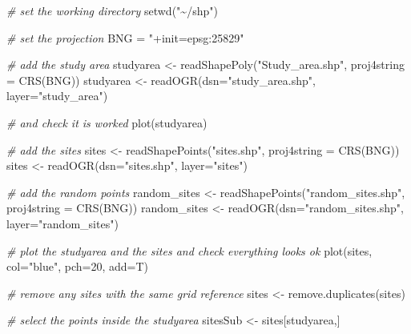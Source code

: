 \documentclass[
]{article}
\newenvironment{Shaded}{\begin{snugshade}}{\end{snugshade}}
\newcommand{\AttributeTok}[1]{\textcolor[rgb]{0.77,0.63,0.00}{#1}}
\newcommand{\CommentTok}[1]{\textcolor[rgb]{0.56,0.35,0.01}{\textit{#1}}}
\newcommand{\DecValTok}[1]{\textcolor[rgb]{0.00,0.00,0.81}{#1}}
\newcommand{\FunctionTok}[1]{\textcolor[rgb]{0.00,0.00,0.00}{#1}}
\newcommand{\NormalTok}[1]{#1}
\newcommand{\OtherTok}[1]{\textcolor[rgb]{0.56,0.35,0.01}{#1}}
\newcommand{\StringTok}[1]{\textcolor[rgb]{0.31,0.60,0.02}{#1}}
\begin{document}
\begin{Shaded}
\begin{Highlighting}[]
\CommentTok{\# set the working directory             }
\FunctionTok{setwd}\NormalTok{(}\StringTok{"\textasciitilde{}/shp"}\NormalTok{)}

\CommentTok{\# set the projection }
\NormalTok{BNG }\OtherTok{=} \StringTok{"+init=epsg:25829"}

\CommentTok{\# add the study area }
\NormalTok{studyarea }\OtherTok{\textless{}{-}} \FunctionTok{readShapePoly}\NormalTok{(}\StringTok{"Study\_area.shp"}\NormalTok{, }\AttributeTok{proj4string =} \FunctionTok{CRS}\NormalTok{(BNG))}
\NormalTok{studyarea }\OtherTok{\textless{}{-}} \FunctionTok{readOGR}\NormalTok{(}\AttributeTok{dsn=}\StringTok{"study\_area.shp"}\NormalTok{, }\AttributeTok{layer=}\StringTok{"study\_area"}\NormalTok{)}

\CommentTok{\# and check it is worked}
\FunctionTok{plot}\NormalTok{(studyarea)}

\CommentTok{\# add the sites}
\NormalTok{sites }\OtherTok{\textless{}{-}} \FunctionTok{readShapePoints}\NormalTok{(}\StringTok{"sites.shp"}\NormalTok{, }\AttributeTok{proj4string =} \FunctionTok{CRS}\NormalTok{(BNG))}
\NormalTok{sites }\OtherTok{\textless{}{-}} \FunctionTok{readOGR}\NormalTok{(}\AttributeTok{dsn=}\StringTok{"sites.shp"}\NormalTok{, }\AttributeTok{layer=}\StringTok{"sites"}\NormalTok{)}

\CommentTok{\# add the random points}
\NormalTok{random\_sites }\OtherTok{\textless{}{-}} \FunctionTok{readShapePoints}\NormalTok{(}\StringTok{"random\_sites.shp"}\NormalTok{, }\AttributeTok{proj4string =} \FunctionTok{CRS}\NormalTok{(BNG))}
\NormalTok{random\_sites }\OtherTok{\textless{}{-}} \FunctionTok{readOGR}\NormalTok{(}\AttributeTok{dsn=}\StringTok{"random\_sites.shp"}\NormalTok{, }\AttributeTok{layer=}\StringTok{"random\_sites"}\NormalTok{)}

\CommentTok{\# plot the studyarea and the sites and check everything looks ok}
\FunctionTok{plot}\NormalTok{(sites, }\AttributeTok{col=}\StringTok{"blue"}\NormalTok{, }\AttributeTok{pch=}\DecValTok{20}\NormalTok{, }\AttributeTok{add=}\NormalTok{T)}

\CommentTok{\# remove any sites with the same grid reference}
\NormalTok{sites }\OtherTok{\textless{}{-}} \FunctionTok{remove.duplicates}\NormalTok{(sites)}

\CommentTok{\# select the points inside the studyarea }
\NormalTok{sitesSub }\OtherTok{\textless{}{-}}\NormalTok{ sites[studyarea,]}


\end{Highlighting}
\end{Shaded}
\end{document}
